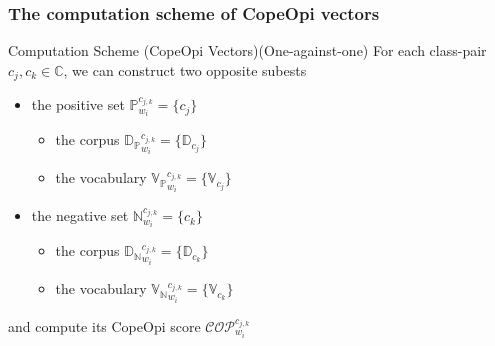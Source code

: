 \documentclass[mathserif]{beamer}
\begin{document}
\begin{frame}
\frametitle{The computation scheme of CopeOpi vectors}
\begin{block}{Computation Scheme (CopeOpi Vectors)(One-against-one)}
For each class-pair $c_j,c_k \in \mathbb{C}$, we can construct two opposite subests
\begin{itemize}
\item the positive set $\mathbb{P}^{c_{j,k}}_{w_i} = \{c_j\}$
	\begin{itemize}
	\item the corpus ${\mathbb{D}_\mathbb{P}}^{c_{j,k}}_{w_i} = \{\mathbb{D}_{c_j}\}$
	\item the vocabulary ${\mathbb{V}_\mathbb{P}}^{c_{j,k}}_{w_i} = \{\mathbb{V}_{c_j}\}$
	\end{itemize}
\item the negative set $\mathbb{N}^{c_{j,k}}_{w_i} = \{c_k\}$
	\begin{itemize}
	\item the corpus ${\mathbb{D}_\mathbb{N}}^{c_{j,k}}_{w_i} = \{\mathbb{D}_{c_k}\}$
	\item the vocabulary ${\mathbb{V}_\mathbb{N}}^{c_{j,k}}_{w_i} = \{\mathbb{V}_{c_k}\}$
	\end{itemize}
\end{itemize}
and compute its CopeOpi score $\mathcal{COP}^{c_{j,k}}_{w_i}$
\end{block}
\end{frame}
\end{document}
